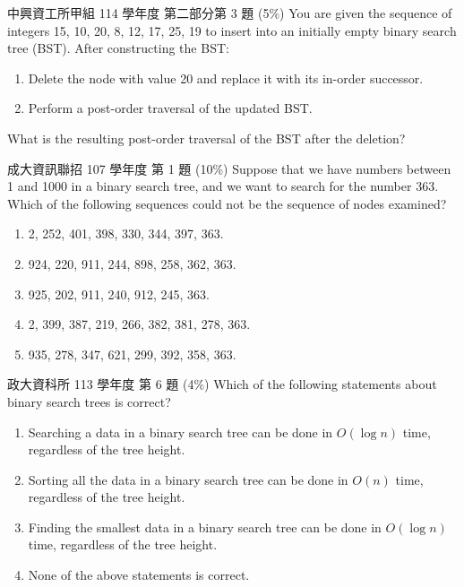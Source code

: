 \begin{pastexam}[label={px:bst-2}]{中興資工所甲組 114 學年度 第二部分第 3 題}
(5\%) You are given the sequence of integers 15, 10, 20, 8, 12, 17, 25, 19 to insert into an initially empty binary search tree (BST). After constructing the BST:
\begin{enumerate}[label=\Roman*.]
\item Delete the node with value 20 and replace it with its in-order successor.
\item Perform a post-order traversal of the updated BST.
\end{enumerate}
What is the resulting post-order traversal of the BST after the deletion?
\end{pastexam}

\begin{pastexam}[label={px:bst-3}]{成大資訊聯招 107 學年度 第 1 題}
(10\%) Suppose that we have numbers between 1 and 1000 in a binary search tree, and we want to search for the number 363. Which of the following sequences could not be the sequence of nodes examined?
\begin{enumerate}[label=\alph*.]
\item 2, 252, 401, 398, 330, 344, 397, 363.
\item 924, 220, 911, 244, 898, 258, 362, 363.
\item 925, 202, 911, 240, 912, 245, 363.
\item 2, 399, 387, 219, 266, 382, 381, 278, 363.
\item 935, 278, 347, 621, 299, 392, 358, 363.
\end{enumerate}
\end{pastexam}

\begin{pastexam}[label={px:bst-4}]{政大資科所 113 學年度 第 6 題}
(4\%) Which of the following statements about binary search trees is correct?
\begin{enumerate}[label=\Alph*.]
\item Searching a data in a binary search tree can be done in $O(\log n)$ time, regardless of the tree height.
\item Sorting all the data in a binary search tree can be done in $O(n)$ time, regardless of the tree height.
\item Finding the smallest data in a binary search tree can be done in $O(\log n)$ time, regardless of the tree height.
\item None of the above statements is correct.
\end{enumerate}
\end{pastexam}

